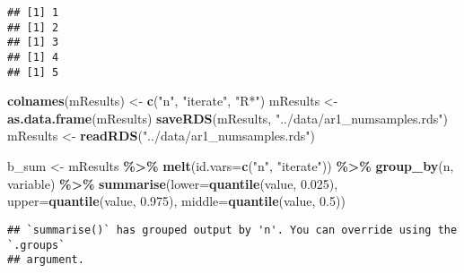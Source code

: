 \documentclass[
]{article}
\newenvironment{Shaded}{\begin{snugshade}}{\end{snugshade}}
\newcommand{\AttributeTok}[1]{\textcolor[rgb]{0.13,0.29,0.53}{#1}}
\newcommand{\FloatTok}[1]{\textcolor[rgb]{0.00,0.00,0.81}{#1}}
\newcommand{\FunctionTok}[1]{\textcolor[rgb]{0.13,0.29,0.53}{\textbf{#1}}}
\newcommand{\NormalTok}[1]{#1}
\newcommand{\OtherTok}[1]{\textcolor[rgb]{0.56,0.35,0.01}{#1}}
\newcommand{\SpecialCharTok}[1]{\textcolor[rgb]{0.81,0.36,0.00}{\textbf{#1}}}
\newcommand{\StringTok}[1]{\textcolor[rgb]{0.31,0.60,0.02}{#1}}
\begin{document}
\begin{verbatim}
## [1] 1
## [1] 2
## [1] 3
## [1] 4
## [1] 5
\end{verbatim}

\begin{Shaded}
\begin{Highlighting}[]
\FunctionTok{colnames}\NormalTok{(mResults) }\OtherTok{\textless{}{-}} \FunctionTok{c}\NormalTok{(}\StringTok{"n"}\NormalTok{, }\StringTok{"iterate"}\NormalTok{, }\StringTok{"R*"}\NormalTok{)}
\NormalTok{mResults }\OtherTok{\textless{}{-}} \FunctionTok{as.data.frame}\NormalTok{(mResults)}
\FunctionTok{saveRDS}\NormalTok{(mResults, }\StringTok{"../data/ar1\_numsamples.rds"}\NormalTok{)}
\NormalTok{mResults }\OtherTok{\textless{}{-}} \FunctionTok{readRDS}\NormalTok{(}\StringTok{"../data/ar1\_numsamples.rds"}\NormalTok{)}

\NormalTok{b\_sum }\OtherTok{\textless{}{-}}\NormalTok{ mResults }\SpecialCharTok{\%\textgreater{}\%} 
  \FunctionTok{melt}\NormalTok{(}\AttributeTok{id.vars=}\FunctionTok{c}\NormalTok{(}\StringTok{"n"}\NormalTok{, }\StringTok{"iterate"}\NormalTok{)) }\SpecialCharTok{\%\textgreater{}\%}
  \FunctionTok{group\_by}\NormalTok{(n, variable) }\SpecialCharTok{\%\textgreater{}\%} 
  \FunctionTok{summarise}\NormalTok{(}\AttributeTok{lower=}\FunctionTok{quantile}\NormalTok{(value, }\FloatTok{0.025}\NormalTok{),}
         \AttributeTok{upper=}\FunctionTok{quantile}\NormalTok{(value, }\FloatTok{0.975}\NormalTok{),}
         \AttributeTok{middle=}\FunctionTok{quantile}\NormalTok{(value, }\FloatTok{0.5}\NormalTok{))}
\end{Highlighting}
\end{Shaded}

\begin{verbatim}
## `summarise()` has grouped output by 'n'. You can override using the `.groups`
## argument.
\end{verbatim}
\end{document}
